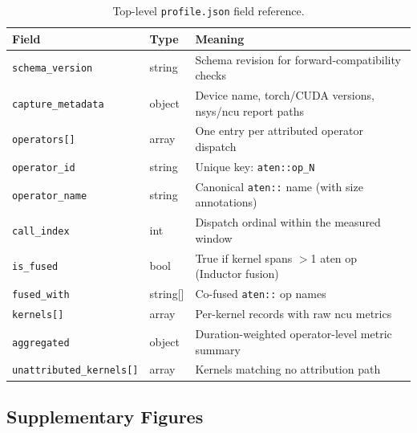 \begin{table}[h]
\centering
\caption{Top-level \texttt{profile.json} field reference.}
\label{tab:schema_fields}
\scriptsize
\setlength{\tabcolsep}{4pt}
\begin{tabular}{lp{3.5cm}p{7.5cm}}
\toprule
\textbf{Field} & \textbf{Type} & \textbf{Meaning} \\
\midrule
\texttt{schema\_version}       & string        & Schema revision for forward-compatibility checks \\
\texttt{capture\_metadata}     & object        & Device name, torch/CUDA versions, nsys/ncu report paths \\
\texttt{operators[]}           & array         & One entry per attributed operator dispatch \\
\quad\texttt{operator\_id}     & string        & Unique key: \texttt{aten::op\_N} \\
\quad\texttt{operator\_name}   & string        & Canonical \texttt{aten::} name (with size annotations) \\
\quad\texttt{call\_index}      & int           & Dispatch ordinal within the measured window \\
\quad\texttt{is\_fused}        & bool          & True if kernel spans $>$1 aten op (Inductor fusion) \\
\quad\texttt{fused\_with}      & string[]      & Co-fused \texttt{aten::} op names \\
\quad\texttt{kernels[]}        & array         & Per-kernel records with raw ncu metrics \\
\quad\texttt{aggregated}       & object        & Duration-weighted operator-level metric summary \\
\texttt{unattributed\_kernels[]} & array       & Kernels matching no attribution path \\
\bottomrule
\end{tabular}
\end{table}

\subsection{Supplementary Figures}
\label{sec:appendix:candidates}

